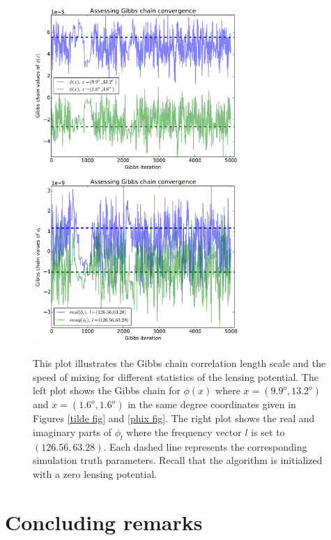 \documentclass[iop,revtex4,apj,onecolumn]{emulateapj}
\begin{document}
\begin{figure}
\begin{center}
{\includegraphics[height=2.5in]{figure10a.pdf}}%
{\includegraphics[height=2.5in]{figure10b.pdf}}
\end{center}
\caption{\label{assessing convergence fig} This plot illustrates the Gibbs chain correlation length scale  and the speed of mixing for different statistics of the lensing potential. The left plot shows the Gibbs chain for $\phi(x)$ where $x = (9.9^o, 13.2^o)$ and $x = (1.6^o, 1.6^o)$ in the same degree coordinates given in Figures \ref{tilde fig} and \ref{phix fig}. The right plot shows the real and imaginary parts of $\phi_l$ where the frequency vector $l$ is set to  $(126.56,63.28)$. Each dashed line represents the corresponding simulation truth parameters. Recall that the algorithm is initialized with a zero lensing potential.
}
\end{figure}


%
%
\section{Concluding remarks}
\end{document}
